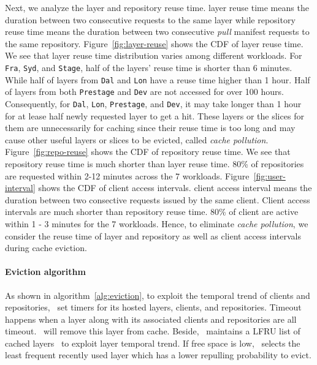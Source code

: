 Next, we analyze the layer and repository reuse time.
layer reuse time means the duration between two consecutive requests to the same layer
while repository reuse time means the duration between two consecutive \emph{pull} manifest requests to the same repository.
Figure~\ref{fig:layer-reuse} shows the CDF of layer reuse time. 
We see that layer reuse time distribution varies among different workloads.
For \texttt{Fra}, \texttt{Syd}, and \texttt{Stage},
half of the layers' reuse time is shorter than 6 minutes.
While half of layers from \texttt{Dal} and \texttt{Lon} have a reuse time higher than 1 hour.
Half of layers from both \texttt{Prestage} and \texttt{Dev} are not accessed for over 100 hours.
Consequently, for \texttt{Dal}, \texttt{Lon}, \texttt{Prestage}, and \texttt{Dev}, 
it may take longer than 1 hour for at lease half newly requested layer to get a hit. 
These layers or the slices for them are unnecessarily for caching since 
their reuse time is too long and may cause other useful layers or slices to be evicted, called \emph{cache pollution}.
Figure~\ref{fig:repo-reuse} shows the CDF of repository reuse time.
We see that repository reuse time is much shorter than layer reuse time.
80\% of repositories are requested within 2-12 minutes across the 7 workloads.
Figure~\ref{fig:user-interval} shows the CDF of client access intervals.
client access interval means the duration between two consective requests issued by the same client.
Client access intervals are much shorter than repository reuse time.
80\% of client are active within 1 - 3 minutes for the 7 workloads. 
Hence, to eliminate \emph{cache pollution},
we consider the reuse time of layer and repository as well as client access intervals during
cache eviction.

\paragraph{Eviction algorithm}
As shown in algorithm~\ref{alg:eviction}, to exploit the temporal trend of clients and repositories, 
\preconstructcachename~set timers for its hosted layers, clients, and repositories.
Timeout happens when a layer along with its associated clients and repositories are all timeout.
\preconstructcachename~will remove this layer from cache.
Beside,
\preconstructcachename~maintains a LFRU list of cached layers~\cite{xxx} to exploit layer temporal trend.
If free space is low,
\preconstructcachename~selects the least frequent recently used layer which has a lower repulling probability to evict.




